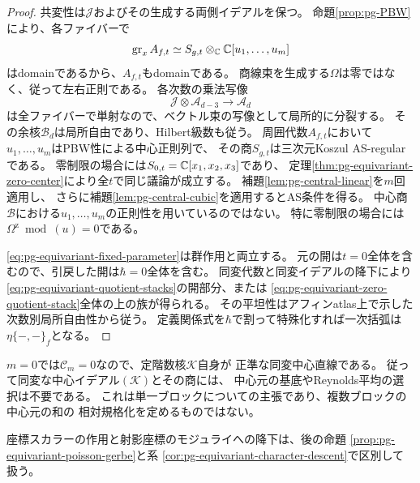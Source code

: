 \begin{proof}
共変性は$\mathcal J$およびその生成する両側イデアルを保つ。
命題\ref{prop:pg-PBW}により、各ファイバーで
\begin{equation}
 \operatorname{gr}_x A_{f,t}
 \simeq S_{g,t}\otimes_\mathbb C\mathbb C[u_1,\ldots,u_m]
 \label{eq:pg-equivariant-fiber-domain}
\end{equation}
はdomainであるから、$A_{f,t}$もdomainである。
商線束を生成する$\Omega$は零ではなく、従って左右正則である。
各次数の乗法写像
\begin{equation}
 \mathcal J\otimes\mathcal A_{d-3}\longrightarrow\mathcal A_d
 \label{eq:pg-equivariant-regular-multiplication}
\end{equation}
は全ファイバーで単射なので、ベクトル束の写像として局所的に分裂する。
その余核$\mathcal B_d$は局所自由であり、Hilbert級数も従う。
周囲代数$A_{f,t}$において$u_1,\ldots,u_m$はPBW性による中心正則列で、
その商$S_{g,t}$は三次元Koszul AS-regularである。
零制限の場合には$S_{0,t}=\mathbb C[x_1,x_2,x_3]$であり、
定理\ref{thm:pg-equivariant-zero-center}により全$t$で同じ議論が成立する。
補題\ref{lem:pg-central-linear}を$m$回適用し、
さらに補題\ref{lem:pg-central-cubic}を適用するとAS条件を得る。
中心商$\mathcal B$における$u_1,\ldots,u_m$の正則性を用いているのではない。
特に零制限の場合には$\Omega^{\mathrm z}\bmod(u)=0$である。

\eqref{eq:pg-equivariant-fixed-parameter}は群作用と両立する。
元の開は$t=0$全体を含むので、引戻した開は$\hbar=0$全体を含む。
同変代数と同変イデアルの降下により
\eqref{eq:pg-equivariant-quotient-stacks}の開部分、または
\eqref{eq:pg-equivariant-zero-quotient-stack}全体の上の族が得られる。
その平坦性はアフィンatlas上で示した次数別局所自由性から従う。
定義関係式を$\hbar$で割って特殊化すれば一次括弧は
$\eta\{-,-\}_f$となる。
\end{proof}

\begin{remark}[純中心部分がない単一ブロック]
\label{rem:pg-equivariant-line-and-gerbe}
$m=0$では$\mathcal C_m=0$なので、定階数核$\mathcal K$自身が
正準な同変中心直線である。
従って同変な中心イデアル$(\mathcal K)$とその商には、
中心元の基底やReynolds平均の選択は不要である。
これは単一ブロックについての主張であり、複数ブロックの中心元の和の
相対規格化を定めるものではない。

座標スカラーの作用と射影座標のモジュライへの降下は、後の命題
\ref{prop:pg-equivariant-poisson-gerbe}と系
\ref{cor:pg-equivariant-character-descent}で区別して扱う。
\end{remark}

